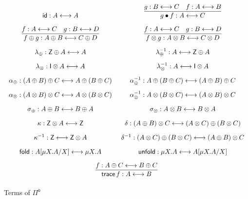 \documentclass[runningheads,a4paper]{llncs}
\newcommand{\Pio}{\ensuremath{\mathsf{\Pi}^{\mathsf{o}}}}
\newcommand{\id}{\mathsf{id}}
\newcommand{\lr}{\longleftrightarrow}
\newcommand{\fold}{\mathsf{fold}}
\newcommand{\unfold}{\mathsf{unfold}}
\newcommand{\trace}{\ensuremath{\mathsf{trace}}}
\newcommand{\Z}{\mathsf{Z}}
\newcommand{\I}{\mathsf{I}}
\begin{document}
\begin{figure}
\[
\arraycolsep=7pt\def\arraystretch{1.8}
\begin{array}{cc}%
\id : A \lr A
& \infer{g \bullet f : A \lr C}{g : B \lr C & f : A \lr B} \\ [.25cm]
\infer{f \oplus g : A \oplus B \lr C \oplus D}{f : A \lr C & g : B \lr D} 
& \infer{f \otimes g : A \otimes B \lr C \otimes D}{f : A \lr C & g : B \lr D} \\
\lambda_{\oplus} : \Z \oplus A \lr A
& \lambda_{\oplus}^{-1} : A \lr \Z \oplus A\\
\lambda_{\otimes} : \I \otimes A \lr A
& \lambda_{\otimes}^{-1} : A \lr \I \otimes A\\
\alpha_{\oplus} : (A \oplus B) \oplus C \lr A \oplus (B \oplus C)
& \alpha_{\oplus}^{-1} : A \oplus (B \oplus C) \lr (A \oplus B) \oplus C \\
\alpha_{\otimes} : (A \otimes B) \otimes C \lr A \otimes (B \otimes C)
& \alpha_{\otimes}^{-1} : A \otimes (B \otimes C) \lr (A \otimes B) \otimes C \\
\sigma_{\oplus} : A \oplus B \lr B \oplus A
& \sigma_{\otimes} : A \otimes B \lr B \otimes A \\
\kappa : \Z \otimes A \lr \Z 
& \delta : (A \oplus B) \otimes C \lr (A \otimes C) \oplus (B \otimes C) \\
\kappa^{-1} : \Z \lr \Z \otimes A
& \delta^{-1} : (A \otimes C) \oplus (B \otimes C)  \lr (A \oplus B) \otimes C \\
\fold : A[\mu X.A/X] \lr \mu X.A
& \unfold : \mu X.A \lr A[\mu X.A/X] \\[.25cm]
\multicolumn{2}{c}{\infer{\trace \,f: A \lr B}{f : A \oplus C \lr B \oplus C}} \\
\end{array}
\]
\caption{Terms of \Pio}
\label{fig:programs}
\end{figure}
\end{document}
